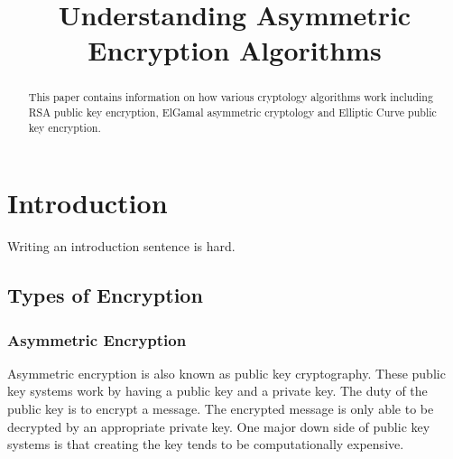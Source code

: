 \documentclass[conference]{IEEEtran}
\begin{document}
	
\title{Understanding Asymmetric Encryption Algorithms}


\author{
\and
{}
}

\maketitle

\begin{abstract}
	This paper contains information on how various cryptology algorithms work including RSA public key encryption, ElGamal asymmetric cryptology and Elliptic Curve public key encryption. 
\end{abstract}

\IEEEpeerreviewmaketitle



\section{Introduction}
Writing an introduction sentence is hard. 

\subsection{Types of Encryption}


\subsubsection{Asymmetric Encryption}
Asymmetric encryption is also known as public key cryptography. These public key systems work by having a public key and a private key. The duty of the public key is to encrypt a message. The encrypted message is only able to be decrypted by an appropriate private key. One major down side of public key systems is that creating the key tends to be computationally expensive. 
\end{document}
